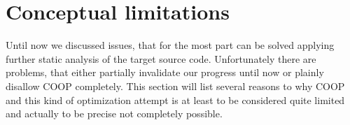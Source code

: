 \section{Conceptual limitations}
Until now we discussed issues, that for the most part can be solved applying further static analysis of the target source code. Unfortunately there are problems, that either partially invalidate our progress until now or plainly disallow COOP completely. This section will list several reasons to why COOP and this kind of optimization attempt is at least to be considered quite limited and actually to be precise not completely possible.
